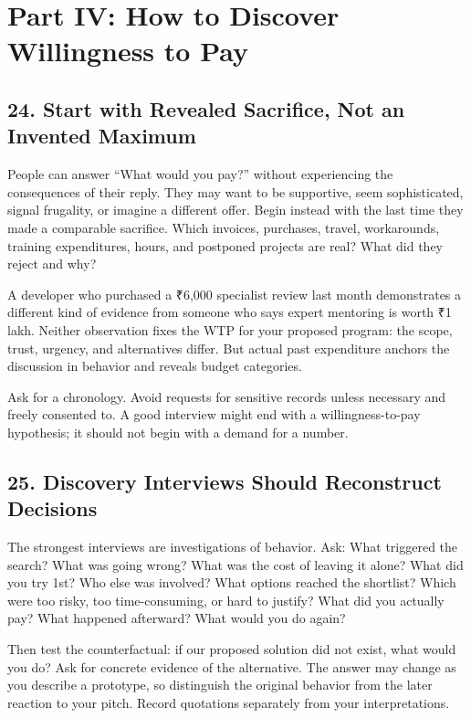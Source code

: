 \section*{Part IV: How to Discover Willingness to Pay}

\subsection*{24. Start with Revealed Sacrifice, Not an Invented Maximum}

People can answer ``What would you pay?'' without experiencing the consequences of their reply. They may want to be supportive, seem sophisticated, signal frugality, or imagine a different offer. Begin instead with the last time they made a comparable sacrifice. Which invoices, purchases, travel, workarounds, training expenditures, hours, and postponed projects are real? What did they reject and why?

A developer who purchased a ₹6,000 specialist review last month demonstrates a different kind of evidence from someone who says expert mentoring is worth ₹1 lakh. Neither observation fixes the WTP for your proposed program: the scope, trust, urgency, and alternatives differ. But actual past expenditure anchors the discussion in behavior and reveals budget categories.

Ask for a chronology. Avoid requests for sensitive records unless necessary and freely consented to. A good interview might end with a willingness-to-pay hypothesis; it should not begin with a demand for a number.

\subsection*{25. Discovery Interviews Should Reconstruct Decisions}

The strongest interviews are investigations of behavior. Ask: What triggered the search? What was going wrong? What was the cost of leaving it alone? What did you try 1st? Who else was involved? What options reached the shortlist? Which were too risky, too time-consuming, or hard to justify? What did you actually pay? What happened afterward? What would you do again?

Then test the counterfactual: if our proposed solution did not exist, what would you do? Ask for concrete evidence of the alternative. The answer may change as you describe a prototype, so distinguish the original behavior from the later reaction to your pitch. Record quotations separately from your interpretations.

